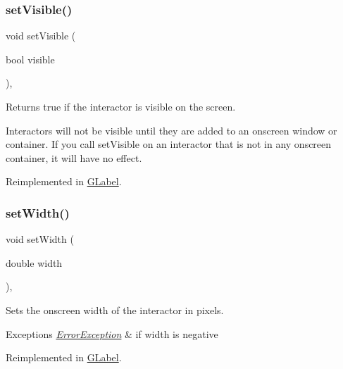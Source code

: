\subsubsection{\texorpdfstring{set\+Visible()}{setVisible()}}
{\footnotesize\ttfamily void set\+Visible (\begin{DoxyParamCaption}\item[{bool}]{visible }\end{DoxyParamCaption})\hspace{0.3cm}{\ttfamily [virtual]}, {\ttfamily [inherited]}}



Returns true if the interactor is visible on the screen. 

Interactors will not be visible until they are added to an onscreen window or container. If you call set\+Visible on an interactor that is not in any onscreen container, it will have no effect. 

Reimplemented in \mbox{\hyperlink{classGLabel_a95c2a1221e6c59e9de544054963b4b18}{G\+Label}}.

\mbox{\label{classGInteractor_aa3f3fba4cb131baa8696ba01e3bceca1}} 
\subsubsection{\texorpdfstring{set\+Width()}{setWidth()}}
{\footnotesize\ttfamily void set\+Width (\begin{DoxyParamCaption}\item[{double}]{width }\end{DoxyParamCaption})\hspace{0.3cm}{\ttfamily [virtual]}, {\ttfamily [inherited]}}



Sets the onscreen width of the interactor in pixels. 


\begin{DoxyExceptions}{Exceptions}
{\em \mbox{\hyperlink{classErrorException}{Error\+Exception}}} & if width is negative \\
\hline
\end{DoxyExceptions}


Reimplemented in \mbox{\hyperlink{classGLabel_aca9b9c666c4162ab0a27a10530bc0762}{G\+Label}}.

\mbox{\label{classGInteractor_a9c18fcc579333bf9653d13ad2b372e39}} 
